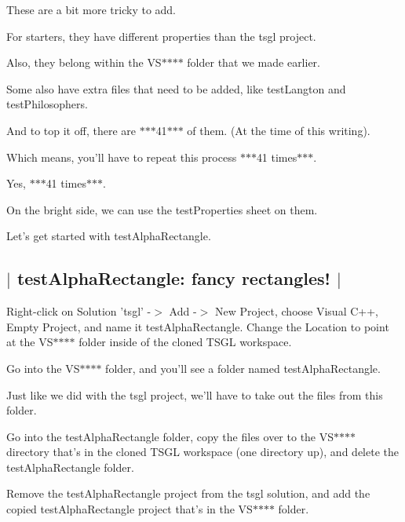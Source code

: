These are a bit more tricky to add.

For starters, they have different properties than the {\ttfamily tsgl} project.

Also, they belong within the {\ttfamily V\-S$\ast$$\ast$$\ast$$\ast$} folder that we made earlier.

Some also have extra files that need to be added, like {\ttfamily test\-Langton} and {\ttfamily test\-Philosophers}.

And to top it off, there are $\ast$$\ast$$\ast$41$\ast$$\ast$$\ast$ of them. (At the time of this writing).

Which means, you'll have to repeat this process $\ast$$\ast$$\ast$41 times$\ast$$\ast$$\ast$.

Yes, $\ast$$\ast$$\ast$41 times$\ast$$\ast$$\ast$.

On the bright side, we can use the {\ttfamily test\-Properties} sheet on them.

Let's get started with {\ttfamily test\-Alpha\-Rectangle}. 

 \subsection*{$\vert$ test\-Alpha\-Rectangle\-: fancy rectangles! $\vert$ }

Right-\/click on {\ttfamily Solution 'tsgl'} -\/$>$ {\ttfamily Add} -\/$>$ {\ttfamily New Project}, choose {\ttfamily Visual C++}, {\ttfamily Empty Project}, and name it {\ttfamily test\-Alpha\-Rectangle}. Change the {\ttfamily Location} to point at the {\ttfamily V\-S$\ast$$\ast$$\ast$$\ast$} folder inside of the cloned T\-S\-G\-L workspace.

Go into the {\ttfamily V\-S$\ast$$\ast$$\ast$$\ast$} folder, and you'll see a folder named {\ttfamily test\-Alpha\-Rectangle}.

Just like we did with the {\ttfamily tsgl} project, we'll have to take out the files from this folder.

Go into the {\ttfamily test\-Alpha\-Rectangle} folder, copy the files over to the {\ttfamily V\-S$\ast$$\ast$$\ast$$\ast$} directory that's in the cloned T\-S\-G\-L workspace (one directory up), and delete the {\ttfamily test\-Alpha\-Rectangle} folder.

Remove the {\ttfamily test\-Alpha\-Rectangle} project from the {\ttfamily tsgl} solution, and add the copied {\ttfamily test\-Alpha\-Rectangle} project that's in the {\ttfamily V\-S$\ast$$\ast$$\ast$$\ast$} folder.

